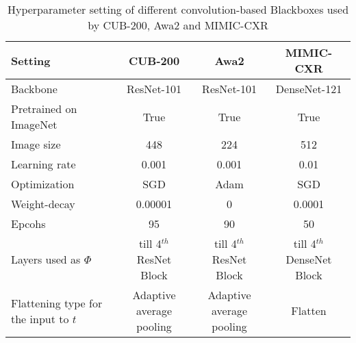 \begin{table}[h]
\caption{Hyperparameter setting of different convolution-based Blackboxes used by CUB-200, Awa2 and MIMIC-CXR}
\label{tab:bb_config}
\begin{center}
\begin{tabular}{l c c c}
\toprule 
     {\textbf{Setting}} & {\textbf{CUB-200}} & {\textbf{Awa2}} & 
    {\textbf{MIMIC-CXR}}\\
\midrule 
       Backbone              & ResNet-101 & ResNet-101 & DenseNet-121  \\
       Pretrained on ImageNet      & True &True & True \\
       Image size            & 448 & 224 & 512 \\
       Learning rate         & 0.001 & 0.001 & 0.01 \\
       Optimization          & SGD & Adam & SGD \\
       Weight-decay      & 0.00001 & 0 & 0.0001 \\
       Epcohs             & 95 & 90 & 50 \\
       Layers used as $\Phi$ &  \makecell{till 4$^{th}$ ResNet \\Block} &  \makecell{till 4$^{th}$ ResNet \\Block} &  \makecell{till 4$^{th}$ DenseNet \\Block} \\
       Flattening type for the input to $t$    &  \makecell{Adaptive average \\pooling} &  \makecell{Adaptive average \\pooling} & Flatten \\
\bottomrule
\end{tabular}
\end{center}
\end{table}



